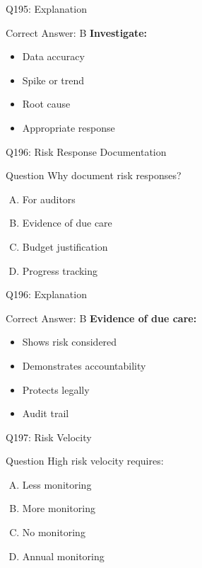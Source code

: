 \documentclass{beamer}
\begin{document}
	\begin{frame}{Q195: Explanation}
		\begin{block}{Correct Answer: B}
			\textbf{Investigate:}
			\begin{itemize}
				\item Data accuracy
				\item Spike or trend
				\item Root cause
				\item Appropriate response
			\end{itemize}
		\end{block}
	\end{frame}
	
	\begin{frame}{Q196: Risk Response Documentation}
		\begin{block}{Question}
			Why document risk responses?
		\end{block}
		\begin{enumerate}[(A)]
			\item For auditors
			\item Evidence of due care
			\item Budget justification
			\item Progress tracking
		\end{enumerate}
	\end{frame}
	
	\begin{frame}{Q196: Explanation}
		\begin{block}{Correct Answer: B}
			\textbf{Evidence of due care:}
			\begin{itemize}
				\item Shows risk considered
				\item Demonstrates accountability
				\item Protects legally
				\item Audit trail
			\end{itemize}
		\end{block}
	\end{frame}
	
	\begin{frame}{Q197: Risk Velocity}
		\begin{block}{Question}
			High risk velocity requires:
		\end{block}
		\begin{enumerate}[(A)]
			\item Less monitoring
			\item More monitoring
			\item No monitoring
			\item Annual monitoring
		\end{enumerate}
	\end{frame}
	
\end{document}
